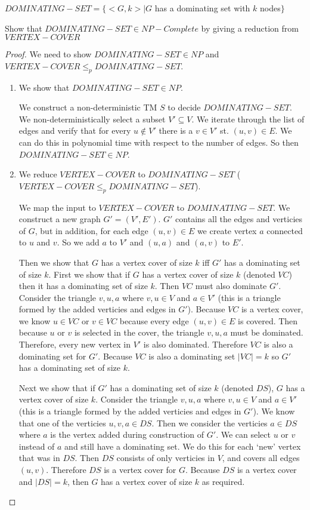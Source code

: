 \documentclass[11pt]{article}
\begin{document}
$DOMINATING-SET = \{ <G, k> | G $ has a dominating set with $k$ nodes$\}$

Show that $DOMINATING-SET \in NP-Complete$ by giving a reduction from $VERTEX-COVER$



\begin{proof}

We need to show $DOMINATING-SET \in NP$ and $VERTEX-COVER \leq _p DOMINATING-SET$.

\begin{enumerate}[label=\alph*)]

\item We show that $DOMINATING-SET \in NP$. 

We construct a non-deterministic TM $S$ to decide $DOMINATING-SET$. We non-deterministically select a subset $V' \subseteq V$. We iterate through the list of edges and verify that for every $u \notin V'$ there is a $v \in V'$ st. $(u, v) \in E$. We can do this in polynomial time with respect to the number of edges. So then $DOMINATING-SET \in NP$.


\item We reduce $VERTEX-COVER$ to $DOMINATING-SET$ ($VERTEX-COVER \leq _p DOMINATING-SET$). 

We map the input to $VERTEX-COVER$ to $DOMINATING-SET$. We construct a new graph $G' = (V', E')$. $G'$ contains all the edges and verticies of $G$, but in addition, for each edge $(u, v) \in E$ we create vertex $a$ connected to $u$ and $v$. So we add $a$ to $V'$ and $(u, a)$ and $(a, v)$ to $E'$.

Then we show that $G$ has a vertex cover of size $k$ iff $G'$ has a dominating set of size $k$. 
First we show that if $G$ has a vertex cover of size $k$ (denoted $VC$) then it has a dominating set of size $k$.  Then $VC$ must also dominate $G'$. Consider the triangle $v, u, a$ where $v, u \in V$ and $a \in V'$ (this is a triangle formed by the added verticies and edges in $G'$). Because $VC$ is a vertex cover, we know $u \in VC$ or $v \in VC$ because every edge $(u,v) \in E$ is covered. Then because $u$ or $v$ is selected in the cover, the triangle $v, u, a$ must be dominated. Therefore, every new vertex in $V'$ is also dominated. Therefore $VC$ is also a dominating set for $G'$. Because $VC$ is also a dominating set $|VC| = k$ so $G'$ has a dominating set of size $k$.

Next we show that if $G'$ has a dominating set of size $k$ (denoted $DS$), $G$ has a vertex cover of size $k$. Consider the triangle $v, u, a$ where $v, u \in V$ and $a \in V'$ (this is a triangle formed by the added verticies and edges in $G'$). We know that one of the verticies $u, v, a \in DS$. Then we consider the verticies $a \in DS$ where $a$ is the vertex added during construction of $G'$. We can select $u$ or $v$ instead of $a$ and still have a dominating set. We do this for each `new' vertex that was in $DS$. Then $DS$ consists of only verticies in $V$, and covers all edges $(u, v)$. Therefore $DS$ is a vertex cover for $G$. Because $DS$ is a vertex cover and $|DS| = k$, then $G$ has a vertex cover of size $k$ as required.


\end{enumerate}
\end{proof}
\end{document}
